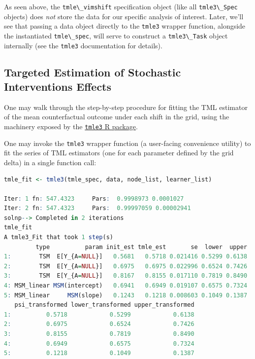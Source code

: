 \documentclass[
  12pt, krantz2,
]{krantz}
\newcommand{\passthrough}[1]{#1}
\newcommand{\1}{\mathbbm{1}}
\theoremstyle{definition}
\theoremstyle{definition}
\theoremstyle{definition}
\theoremstyle{definition}
\theoremstyle{remark}
\begin{document}
As seen above, the \passthrough{\lstinline!tmle\_vimshift!} specification object (like all \passthrough{\lstinline!tmle3\_Spec!}
objects) does \emph{not} store the data for our specific analysis of interest. Later,
we'll see that passing a data object directly to the \passthrough{\lstinline!tmle3!} wrapper function,
alongside the instantiated \passthrough{\lstinline!tmle\_spec!}, will serve to construct a \passthrough{\lstinline!tmle3\_Task!}
object internally (see the \passthrough{\lstinline!tmle3!} documentation for details).

\hypertarget{targeted-estimation-of-stochastic-interventions-effects-1}{%
\subsection{Targeted Estimation of Stochastic Interventions Effects}\label{targeted-estimation-of-stochastic-interventions-effects-1}}

One may walk through the step-by-step procedure for fitting the TML estimator
of the mean counterfactual outcome under each shift in the grid, using the
machinery exposed by the \href{https://tmle3.tlverse.org/}{\passthrough{\lstinline!tmle3!} R package}.

One may invoke the \passthrough{\lstinline!tmle3!} wrapper function (a user-facing convenience utility)
to fit the series of TML estimators (one for each parameter defined by the grid
delta) in a single function call:

\begin{lstlisting}[language=R]
tmle_fit <- tmle3(tmle_spec, data, node_list, learner_list)

Iter: 1 fn: 547.4323     Pars:  0.9998973 0.0001027
Iter: 2 fn: 547.4323     Pars:  0.99997059 0.00002941
solnp--> Completed in 2 iterations
tmle_fit
A tmle3_Fit that took 1 step(s)
         type          param init_est tmle_est       se  lower  upper
1:        TSM  E[Y_{A=NULL}]   0.5681   0.5718 0.021416 0.5299 0.6138
2:        TSM  E[Y_{A=NULL}]   0.6975   0.6975 0.022996 0.6524 0.7426
3:        TSM  E[Y_{A=NULL}]   0.8167   0.8155 0.017110 0.7819 0.8490
4: MSM_linear MSM(intercept)   0.6941   0.6949 0.019107 0.6575 0.7324
5: MSM_linear     MSM(slope)   0.1243   0.1218 0.008603 0.1049 0.1387
   psi_transformed lower_transformed upper_transformed
1:          0.5718            0.5299            0.6138
2:          0.6975            0.6524            0.7426
3:          0.8155            0.7819            0.8490
4:          0.6949            0.6575            0.7324
5:          0.1218            0.1049            0.1387
\end{lstlisting}
\end{document}
